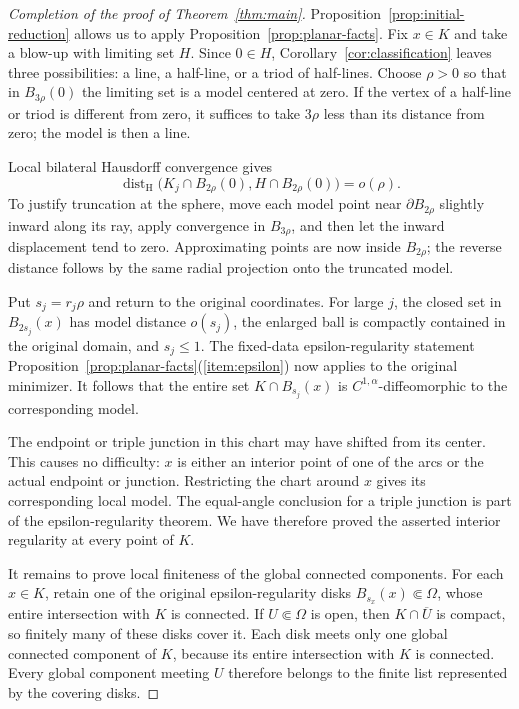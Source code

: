 \begin{proof}[Completion of the proof of Theorem~\ref{thm:main}]
Proposition~\ref{prop:initial-reduction} allows us to apply
Proposition~\ref{prop:planar-facts}.  Fix $x\in K$ and take a blow-up with
limiting set $H$.  Since $0\in H$, Corollary~\ref{cor:classification} leaves
three possibilities: a line, a half-line, or a triod of half-lines.
Choose $\rho>0$ so that in $B_{3\rho}(0)$ the limiting set is a model centered
at zero.  If the vertex of a half-line or triod is different from zero, it
suffices to take $3\rho$ less than its distance from zero; the model is then a
line.

Local bilateral Hausdorff convergence gives
\[
 \operatorname{dist}_{\mathrm H}
 \bigl(K_j\cap B_{2\rho}(0),H\cap B_{2\rho}(0)\bigr)=o(\rho).
\]
To justify truncation at the sphere, move each model point near
$\partial B_{2\rho}$ slightly inward along its ray, apply convergence in
$B_{3\rho}$, and then let the inward displacement tend to zero.  Approximating
points are now inside $B_{2\rho}$; the reverse distance follows by the same
radial projection onto the truncated model.

Put $s_j=r_j\rho$ and return to the original coordinates.  For large $j$, the
closed set in $B_{2s_j}(x)$ has model distance $o(s_j)$, the enlarged ball is
compactly contained in the original domain, and $s_j\leq1$.  The fixed-data
epsilon-regularity statement
Proposition~\ref{prop:planar-facts}(\ref{item:epsilon}) now applies to the
original minimizer.  It follows that the entire set $K\cap B_{s_j}(x)$ is
$C^{1,\alpha}$-diffeomorphic to the corresponding model.

The endpoint or triple junction in this chart may have shifted from its
center.  This causes no difficulty: $x$ is either an interior point of one of
the arcs or the actual endpoint or junction.  Restricting the chart around
$x$ gives its corresponding local model.  The equal-angle conclusion for a
triple junction is part of the epsilon-regularity theorem.  We have therefore
proved the asserted interior regularity at every point of $K$.

It remains to prove local finiteness of the global connected components.
For each $x\in K$, retain one of the original epsilon-regularity disks
$B_{s_x}(x)\Subset\Omega$, whose entire intersection with $K$ is connected.
If $U\Subset\Omega$ is open, then
$K\cap\overline U$ is compact, so finitely many of these disks cover it.
Each disk meets only one global connected component of $K$, because its entire
intersection with $K$ is connected.  Every global component meeting $U$
therefore belongs to the finite list represented by the covering disks.
\end{proof}

